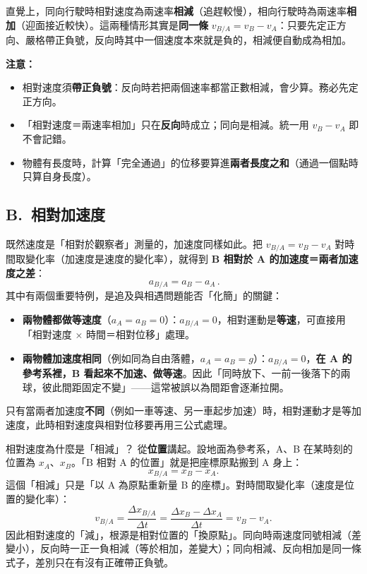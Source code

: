 \documentclass[11pt]{article}
\begin{document}

直覺上，同向行駛時相對速度為兩速率\textbf{相減}（追趕較慢），相向行駛時為兩速率\textbf{相加}（迎面接近較快）。這兩種情形其實是\textbf{同一條} $v_{B/A}=v_B-v_A$：只要先定正方向、嚴格帶正負號，反向時其中一個速度本來就是負的，相減便自動成為相加。

\textbf{注意：}
\begin{itemize}\setlength{\itemsep}{1pt}
\item 相對速度須\textbf{帶正負號}：反向時若把兩個速率都當正數相減，會少算。務必先定正方向。
\item 「相對速度＝兩速率相加」只在\textbf{反向}時成立；同向是相減。統一用 $v_B-v_A$ 即不會記錯。
\item 物體有長度時，計算「完全通過」的位移要算進\textbf{兩者長度之和}（通過一個點時只算自身長度）。
\end{itemize}

\subsection*{\sffamily B.\ 相對加速度}

既然速度是「相對於觀察者」測量的，加速度同樣如此。把 $v_{B/A}=v_B-v_A$ 對時間取變化率（加速度是速度的變化率），就得到 \textbf{B 相對於 A 的加速度＝兩者加速度之差}：
$$\boxed{\,a_{B/A} = a_B - a_A\,}.$$
其中有兩個重要特例，是追及與相遇問題能否「化簡」的關鍵：
\begin{itemize}\setlength{\itemsep}{2pt}
\item \textbf{兩物體都做等速度}（$a_A=a_B=0$）：$a_{B/A}=0$，相對運動是\textbf{等速}，可直接用「相對速度 × 時間＝相對位移」處理。
\item \textbf{兩物體加速度相同}（例如同為自由落體，$a_A=a_B=g$）：$a_{B/A}=0$，\textbf{在 A 的參考系裡，B 看起來不加速、做等速}。因此「同時放下、一前一後落下的兩球，彼此間距固定不變」——這常被誤以為間距會逐漸拉開。
\end{itemize}
只有當兩者加速度\textbf{不同}（例如一車等速、另一車起步加速）時，相對運動才是等加速度，此時相對速度與相對位移要再用三公式處理。

\begin{補充框}{相對速度為什麼是「相減」？}
從\textbf{位置}講起。設地面為參考系，A、B 在某時刻的位置為 $x_A$、$x_B$。「B 相對 A 的位置」就是把座標原點搬到 A 身上：
$$x_{B/A} = x_B - x_A.$$
這個「相減」只是「以 A 為原點重新量 B 的座標」。對時間取變化率（速度是位置的變化率）：
$$v_{B/A} = \frac{\Delta x_{B/A}}{\Delta t} = \frac{\Delta x_B - \Delta x_A}{\Delta t} = v_B - v_A.$$
因此相對速度的「減」，根源是相對位置的「換原點」。同向時兩速度同號相減（差變小），反向時一正一負相減（等於相加，差變大）；同向相減、反向相加是同一條式子，差別只在有沒有正確帶正負號。
\end{補充框}
\end{document}
